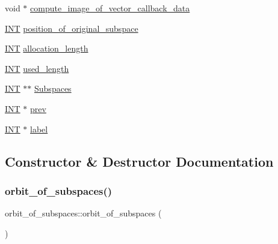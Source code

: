 \begin{DoxyCompactItemize}
\item 
void $\ast$ \mbox{\hyperlink{classorbit__of__subspaces_a2790229f1d563935b52b255655f2bc90}{compute\+\_\+image\+\_\+of\+\_\+vector\+\_\+callback\+\_\+data}}
\item 
\mbox{\hyperlink{galois_8h_a09fddde158a3a20bd2dcadb609de11dc}{I\+NT}} \mbox{\hyperlink{classorbit__of__subspaces_a8e31945270e13759a3400aad20a2c16e}{position\+\_\+of\+\_\+original\+\_\+subspace}}
\item 
\mbox{\hyperlink{galois_8h_a09fddde158a3a20bd2dcadb609de11dc}{I\+NT}} \mbox{\hyperlink{classorbit__of__subspaces_a5ae0493aa6503601b9a9e01cbd02f935}{allocation\+\_\+length}}
\item 
\mbox{\hyperlink{galois_8h_a09fddde158a3a20bd2dcadb609de11dc}{I\+NT}} \mbox{\hyperlink{classorbit__of__subspaces_a2fec07dcce03bbc9476faae26172ece3}{used\+\_\+length}}
\item 
\mbox{\hyperlink{galois_8h_a09fddde158a3a20bd2dcadb609de11dc}{I\+NT}} $\ast$$\ast$ \mbox{\hyperlink{classorbit__of__subspaces_a9f5e9cbffc7540a68a4ad68614d62d95}{Subspaces}}
\item 
\mbox{\hyperlink{galois_8h_a09fddde158a3a20bd2dcadb609de11dc}{I\+NT}} $\ast$ \mbox{\hyperlink{classorbit__of__subspaces_a450e7901c80f0256b96aab177a615cbd}{prev}}
\item 
\mbox{\hyperlink{galois_8h_a09fddde158a3a20bd2dcadb609de11dc}{I\+NT}} $\ast$ \mbox{\hyperlink{classorbit__of__subspaces_afd4870c2c0ed0f12b0ff24a470a33278}{label}}
\end{DoxyCompactItemize}


\subsection{Constructor \& Destructor Documentation}
\mbox{\label{classorbit__of__subspaces_a8480d53da3072fc761793a3e775d3c95}} 
\subsubsection{\texorpdfstring{orbit\+\_\+of\+\_\+subspaces()}{orbit\_of\_subspaces()}}
{\footnotesize\ttfamily orbit\+\_\+of\+\_\+subspaces\+::orbit\+\_\+of\+\_\+subspaces (\begin{DoxyParamCaption}{ }\end{DoxyParamCaption})}

